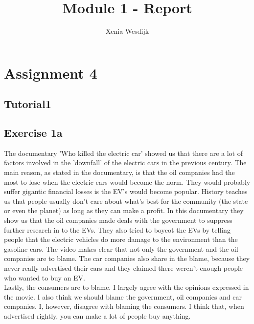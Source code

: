 \documentclass[final]{scrreprt} %
\title{Module 1 - Report}
\author{Xenia {Wesdijk}}
\begin{document}

\chapter{Assignment 4}
\section{Tutorial1}
\section{Exercise 1a} 
The documentary 'Who killed the electric car' showed us that there are a lot of factors involved in the 'downfall' of the electric cars in the previous century. The main reason, as stated in the documentary, is that the oil companies had the most to lose when the electric cars would become the norm. They would probably suffer gigantic financial losses is the EV's would become popular. History teaches us that people usually don't care about what's best for the community (the state or even the planet) as long as they can make a profit. In this documentary they show us that the oil companies made deals with the government to suppress further research in to the EVs. They also tried to boycot the EVs by telling people that the electric vehicles do more damage to the environment than the gasoline cars. 
The video makes clear that not only the government and the oil companies are to blame. The car companies also share in the blame, because they never really advertised their cars and they claimed there weren't enough people who wanted to buy an EV. \\
Lastly, the consumers are to blame. 
I largely agree with the opinions expressed in the movie. I also think we should blame the government, oil companies and car companies. I, however, disagree with blaming the consumers. I think that, when advertised rightly, you can make a lot of people buy anything.
\end{document}
